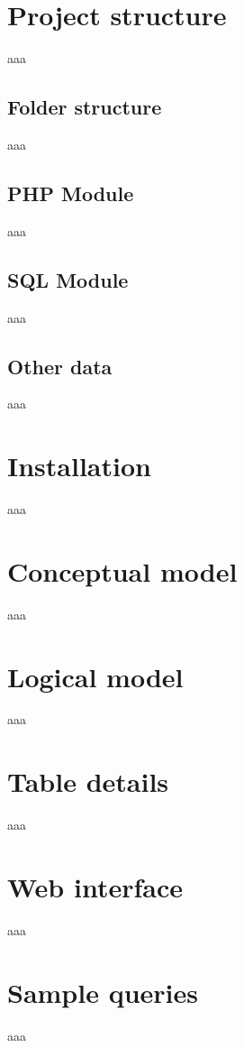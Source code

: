 \documentclass[12pt]{report}
\begin{document}
        \chapter{Project structure}
            aaa

            \section{Folder structure}
                aaa

            \section{PHP Module}
                aaa

            \section{SQL Module}
                aaa

            \section{Other data}
                aaa

        \chapter{Installation}
            aaa

        \chapter{Conceptual model}
            aaa

        \chapter{Logical model}
            aaa

        \chapter{Table details}
            aaa

        \chapter{Web interface}
            aaa

        \chapter{Sample queries}
            aaa
\end{document}
